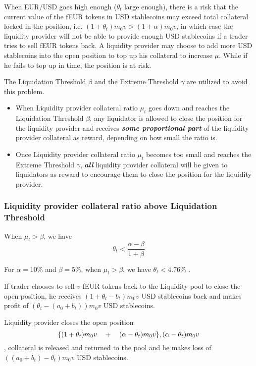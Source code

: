\documentclass{article}
\begin{document}
When EUR/USD goes high enough ($\theta_t$ large enough), there is a risk that the current value of the fEUR tokens in USD stablecoins may exceed total collateral locked in the position, i.e. $(1+\theta_t)m_0 v> (1+\alpha)m_0 v$,  in which case the liquidity provider will not be able to provide enough USD stablecoins if a trader tries to sell fEUR tokens back. A liquidity provider may choose to add more USD stablecoins into the open position to top up his collateral to increase $\mu$. While if he fails to top up in time, the position is at risk. \par 

The Liquidation Threshold $\beta$ and the Extreme Threshold $\gamma$ are utilized to avoid this problem. 
\begin{itemize}
    \item When Liquidity provider collateral ratio $\mu_t$ goes down and reaches the Liquidation Threshold $\beta$, any liquidator is allowed to close the position for the liquidity provider and receives \textbf{\textit{some proportional part}} of the liquidity provider collateral as reward, depending on how small the ratio is.
    \item Once Liquidity provider collateral ratio $\mu_t$ becomes too small and reaches the Extreme Threshold  $\gamma$, \textbf{\textit{all}} liquidity provider collateral will be given to liquidators as reward to encourage them to close the position for the liquidity provider.
\end{itemize}
 
\subsubsection{Liquidity provider collateral ratio above Liquidation Threshold}
When  $\mu_t>\beta$, we have
$$\theta_t<\frac{\alpha - \beta}{1+ \beta}$$

For $\alpha = 10\%$ and $\beta = 5\%$, when $\mu_t>\beta$, we have $\theta_t<4.76\%$ .\par

If trader chooses to sell $v$ fEUR tokens back to the Liquidity pool to close the open position, he receives $(1+\theta_t -b_t)m_0 v$ USD stablecoins back and makes profit of  $(\theta_t -(a_0+b_t))m_0 v$ USD stablecoins.\par

Liquidity provider closes the open position
$$\{ (1+\theta_t)m_0 v   \quad +  \quad  (\alpha-\theta_t)m_0 v \}, \\ (\alpha-\theta_t)m_0 v$$
, collateral is released and returned to the pool and he makes loss of \\
$((a_0+b_t) - \theta_t)m_0 v$ USD stablecoins. \par
\end{document}
